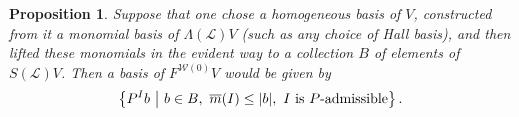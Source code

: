 \documentclass[11pt]{amsart}
\theoremstyle{plain}
\newtheorem{prop}[thm]{Proposition}
\theoremstyle{definition}
\renewcommand{\to}{\longrightarrow}
\newcommand{\scrL}{\mathscr{L}}
\newcommand{\scrC}{\mathscr{C}}
\newcommand{\calW}{\mathcal{W}}
\newcommand{\calP}{\mathcal{P}}
\newcommand{\calV}{\mathcal{V}}
\theoremstyle{plain}
\newcommand{\Palg}{{\calP}}
\newcommand{\LieOperad}{{\scrL}}
\newcommand{\vect}[2]{\calV^{#1}_{#2}}
\newcommand{\minDimP}{\overline{m}}
\newcommand{\algs}{{\scrC\!\textit{om}}}
\begin{document}
\begin{Constructing (co)homotopy operations}
\begin{prop}
Suppose that one chose a homogeneous basis of $V$, constructed from it a monomial  basis of $\Lambda(\LieOperad)V$ (such as any choice of Hall basis), and then lifted these monomials in the evident way to a collection $B$ of elements of $S(\LieOperad)V$. Then a basis of $F^{\calW(0)}V$ would be given by
\[\left\{P^Ib\ \middle|\ b\in B,\ \minDimP(I)\leq|b|,\ \textup{$I$ is $P$-admissible}\right\}.\]
\end{prop}
%
%
%
%
%
%
%

\end{Constructing (co)homotopy operations}
\end{document}
